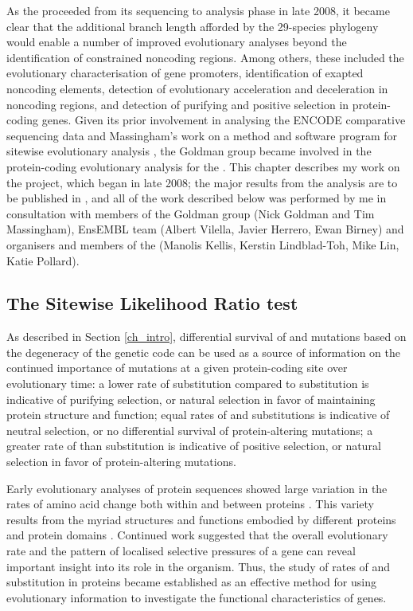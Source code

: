As the \mgp proceeded from its sequencing to analysis phase in late
2008, it became clear that the additional branch length afforded by
the 29-species phylogeny would enable a number of improved
evolutionary analyses beyond the identification of constrained
noncoding regions. Among others, these included the evolutionary
characterisation of gene promoters, identification of exapted
noncoding elements, detection of evolutionary acceleration and
deceleration in noncoding regions, and detection of purifying and
positive selection in protein-coding genes. Given its prior
involvement in analysing the ENCODE comparative sequencing data
\citep{TODO} and Massingham's work on a method and software program
for sitewise evolutionary analysis \citep{TODO}, the Goldman group
became involved in the protein-coding evolutionary analysis for the
\mgp. This chapter describes my work on the project, which began in
late 2008; the major results from the analysis are to be published in
\citep{TODO}, and all of the work described below was performed by me
in consultation with members of the Goldman group (Nick Goldman and
Tim Massingham), EnsEMBL team (Albert Vilella, Javier Herrero, Ewan
Birney) and organisers and members of the \mgp (Manolis Kellis,
Kerstin Lindblad-Toh, Mike Lin, Katie Pollard).

\subsection{The Sitewise Likelihood Ratio test}

As described in Section \ref{ch_intro}, differential survival of \nsyn
and \syn mutations based on the degeneracy of the genetic code can be
used as a source of information on the continued importance of
mutations at a given protein-coding site over evolutionary time: a
lower rate of \nsyn substitution compared to \syn substitution is
indicative of purifying selection, or natural selection in favor of
maintaining protein structure and function; equal rates of \nsyn and
\syn substitutions is indicative of neutral selection, or no
differential survival of protein-altering mutations; a greater rate of
\nsyn than \syn substitution is indicative of positive selection, or
natural selection in favor of protein-altering mutations.

Early evolutionary analyses of protein sequences showed large
variation in the rates of amino acid change both within and between
proteins \citep{TODO}. This variety results from the myriad structures
and functions embodied by different proteins and protein domains
\citep{TODO}. Continued work suggested that the overall evolutionary
rate \cite{TODO,Koonin?} and the pattern of localised selective
pressures \cite{TODO} of a gene can reveal important insight into its
role in the organism. Thus, the study of rates of \nsyn and \syn
substitution in proteins became established as an effective method for
using evolutionary information to investigate the functional
characteristics of genes.

